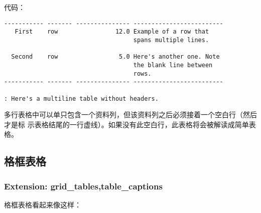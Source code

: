 \documentclass[fancyhdr,bookmark]{ctexbook}
\begin{document}
代码：

\begin{lstlisting}
----------- ------- --------------- -------------------------
   First    row                12.0 Example of a row that
                                    spans multiple lines.

  Second    row                 5.0 Here's another one. Note
                                    the blank line between
                                    rows.
----------- ------- --------------- -------------------------

: Here's a multiline table without headers.
\end{lstlisting}

多行表格中可以单只包含一个资料列，但该资料列之后必须接着一个空白行（然后才是标
示表格结尾的一行虚线）。如果没有此空白行，此表格将会被解读成简单表格。

\hypertarget{ux683cux6846ux8868ux683c}{%
\subsection{格框表格}\label{ux683cux6846ux8868ux683c}}

\hypertarget{extension-grid_tablestable_captions}{%
\subsubsection{Extension:
grid\_tables,table\_captions}\label{extension-grid_tablestable_captions}}

格框表格看起来像这样：
\end{document}
